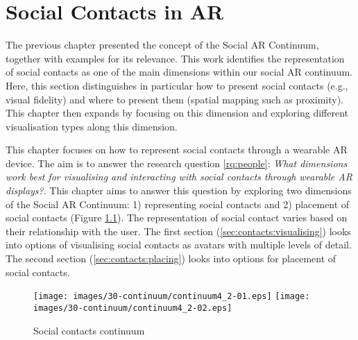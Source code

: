 \chapter{Social Contacts in AR}
\label{ch:contacts} 

The previous chapter presented the concept of the Social AR Continuum, together with examples for its relevance. This work identifies the representation of social contacts as one of the main dimensions within our social AR continuum. Here, this section distinguishes in particular how to present social contacts (e.g., visual fidelity) and where to present them (spatial mapping such as proximity). This chapter then expands by focusing on this dimension and exploring different visualisation types along this dimension. 

This chapter focuses on how to represent social contacts through a wearable AR device. The aim is to answer the research question \ref{rq:people}: \textit{What dimensions work best for visualising and interacting with social contacts through wearable AR displays?}. This chapter aims to answer this question by exploring two dimensions of the Social AR Continuum: 1) representing social contacts and 2) placement of social contacts (Figure \ref{fig:contacts:contacts-continuum}). The representation of social contact varies based on their relationship with the user. 
The first section (\ref{sec:contacts:visualising}) looks into options of visualising social contacts as avatars with multiple levels of detail. The second section (\ref{sec:contacts:placing}) looks into options for placement of social contacts. 

\begin{figure}[h]
  \centering
  \texttt{[image: images/30-continuum/continuum4\_2-01.eps]}
  \texttt{[image: images/30-continuum/continuum4\_2-02.eps]}
  \caption{Social contacts continuum}
  \label{fig:contacts:contacts-continuum}
\end{figure}





